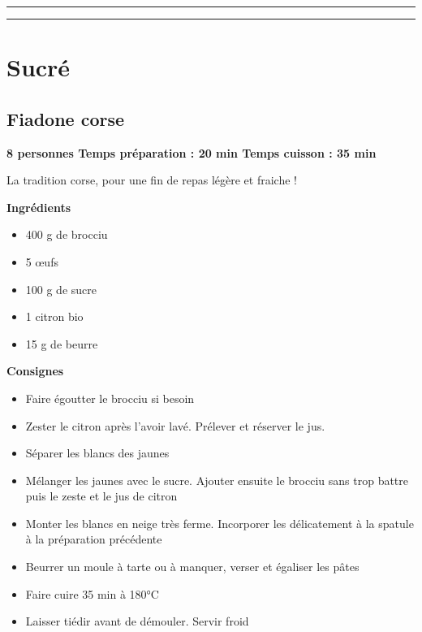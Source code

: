 \documentclass[]{book}
\providecommand{\tightlist}{%
  \setlength{\itemsep}{0pt}\setlength{\parskip}{0pt}}
\begin{document}
\begin{center}\rule{0.5\linewidth}{0.5pt}\end{center}

\begin{center}\rule{0.5\linewidth}{0.5pt}\end{center}

\hypertarget{sucruxe9-2}{%
\section*{Sucré}\label{sucruxe9-2}}

\hypertarget{fiadone-corse}{%
\subsection*{\texorpdfstring{{Fiadone corse}}{Fiadone corse}}\label{fiadone-corse}}

\begin{sucrebox}
\textbf{8 personnes \textbar{} Temps préparation : 20 min \textbar{}
Temps cuisson : 35 min}

La tradition corse, pour une fin de repas légère et fraiche !
\end{sucrebox}

\textbf{Ingrédients}

\begin{itemize}
\tightlist
\item
  400 g de brocciu
\item
  5 œufs
\item
  100 g de sucre
\item
  1 citron bio
\item
  15 g de beurre
\end{itemize}

\textbf{Consignes}

\begin{itemize}
\tightlist
\item
  Faire égoutter le brocciu si besoin
\item
  Zester le citron après l'avoir lavé. Prélever et réserver le jus.
\item
  Séparer les blancs des jaunes
\item
  Mélanger les jaunes avec le sucre. Ajouter ensuite le brocciu sans trop battre puis le zeste et le jus de citron
\item
  Monter les blancs en neige très ferme. Incorporer les délicatement à la spatule à la préparation précédente
\item
  Beurrer un moule à tarte ou à manquer, verser et égaliser les pâtes
\item
  Faire cuire 35 min à 180°C
\item
  Laisser tiédir avant de démouler. Servir froid
\end{itemize}
\end{document}
